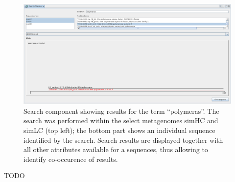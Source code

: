 \begin{figure}[H]
\centering
\includegraphics[width=.9\textwidth]{img/mgx/SearchTC}
\caption[Metagenome search]{Search component showing results for the term ``polymeras''. The search was performed
within the select metagenomes simHC and simLC (top left); the bottom part shows an individual sequence identified
by the search. Search results are displayed together with all other attributes available for a sequences, thus allowing
to identify co-occurence of results.}
\label{search2}
\end{figure}


TODO


